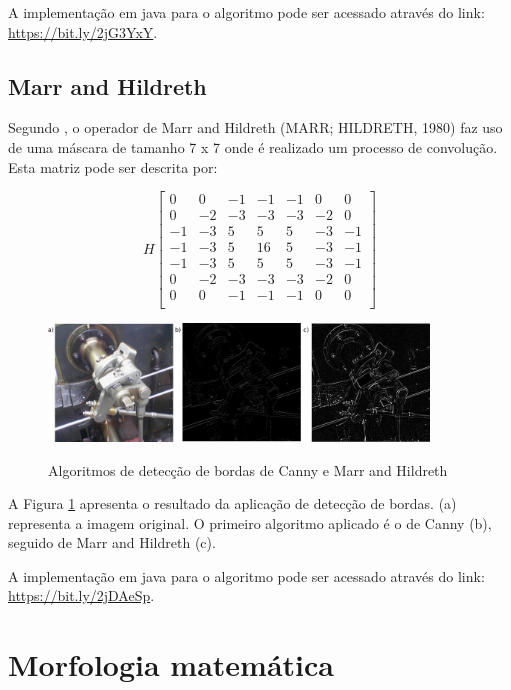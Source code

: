 \documentclass[
	12pt,				%
	oneside,			%
	a4paper,			%
	english,			%
	french,				%
	spanish,			%
	brazil,				%
	]{abntex2}
\begin{document}
A implementação em java para o algoritmo pode ser acessado através do link: \url{https://bit.ly/2jG3YxY}.

\subsection{Marr and Hildreth}
Segundo \citet{pedriniSchwartz:2008}, o operador de Marr and Hildreth (MARR; HILDRETH, 1980) faz uso de uma máscara de tamanho 7 x 7 onde é realizado um processo de convolução. Esta matriz pode ser descrita por:

\[
H 
\begin{bmatrix}
     0 &  0 & -1 & -1 & -1 &  0 &  0            \\ 
     0 & -2 & -3 & -3 & -3 & -2 &  0            \\ 
    -1 & -3 &  5 &  5 &  5 & -3 & -1            \\ 
    -1 & -3 &  5 & 16 &  5 & -3 & -1            \\ 
    -1 & -3 &  5 &  5 &  5 & -3 & -1            \\ 
     0 & -2 & -3 & -3 & -3 & -2 &  0            \\ 
     0 &  0 & -1 & -1 & -1 &  0 &  0            \\ 
\end{bmatrix} 
\]

\begin{figure}[ht]
\centering
\caption{Algoritmos de detecção de bordas de Canny e Marr and Hildreth}
\includegraphics[width=0.9\textwidth]{imagens/deteccao_bordas2.png}
\sourceAuthor
\label{fig:deteccao_bordas2}
\end{figure}

A Figura \ref{fig:deteccao_bordas2} apresenta o resultado da aplicação de detecção de bordas. (a) representa a imagem original. O primeiro algoritmo aplicado é o de  Canny (b), seguido de Marr and Hildreth (c).

A implementação em java para o algoritmo pode ser acessado através do link: \url{https://bit.ly/2jDAeSp}.

\section{Morfologia matemática}
\end{document}
